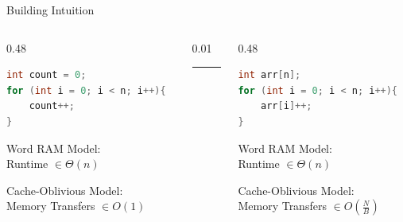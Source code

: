 \documentclass[aspectratio=169, xcolor=dvipsnames]{beamer}
\begin{document}
\begin{frame}[fragile]{Building Intuition}
    \begin{columns}[T]

        \begin{column}{0.48\textwidth}
            \begin{lstlisting}[language=C++, basicstyle=\ttfamily\scriptsize]
int count = 0;
for (int i = 0; i < n; i++){
    count++;
}
            \end{lstlisting}
            \medskip
            Word RAM Model: \\
            Runtime $\in \Theta(n)$
            
            \medskip
            Cache-Oblivious Model: \\
            Memory Transfers $\in O(1)$
        \end{column}

        \begin{column}{0.01\textwidth}
            \centering
            \textcolor{lightgray}{\rule{0.5pt}{0.65\textheight}} 
        \end{column}

        \begin{column}{0.48\textwidth}
            \begin{lstlisting}[language=C++, basicstyle=\ttfamily\scriptsize]
int arr[n];
for (int i = 0; i < n; i++){
    arr[i]++;
}
            \end{lstlisting}
            \medskip
            Word RAM Model: \\
            Runtime $\in \Theta(n)$

            \medskip
            Cache-Oblivious Model: \\
            Memory Transfers $\in O(\frac{N}{B})$
        \end{column}
    \end{columns}

    \centering
\end{frame}
\end{document}
